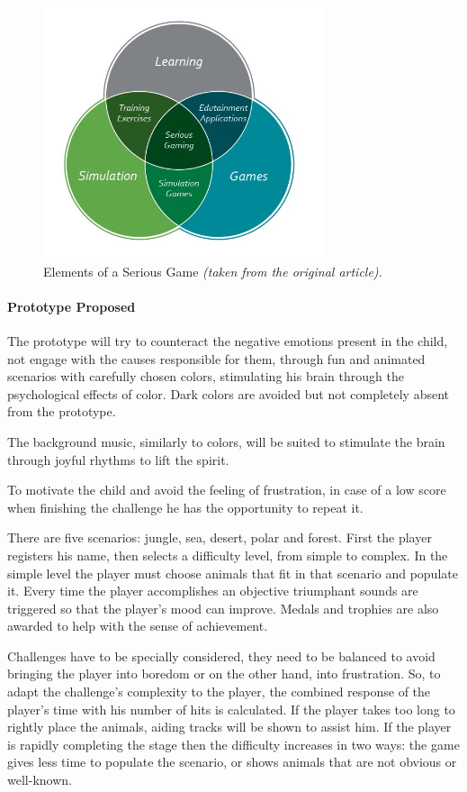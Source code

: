 \documentclass[runningheads]{llncs}
\begin{document}
\begin{figure}
    \centering
    \includegraphics[scale = 0.8]{Chatbot.png}
    \caption{Elements of a Serious Game \textit{(taken from the original article).}}
    \label{fig:Chatbot}
\end{figure}

\paragraph{Prototype Proposed} The prototype will try to counteract the negative emotions present in the child, not engage with the causes responsible for them, through fun and animated scenarios with carefully chosen colors, stimulating his brain through the psychological effects of color. Dark colors are avoided but not completely absent from the prototype.
\par The background music, similarly to colors, will be suited to stimulate the brain through joyful rhythms to lift the spirit.
\par To motivate the child and avoid the feeling of frustration, in case of a low score when finishing the challenge he has the opportunity to repeat it. 
\par There are five scenarios: jungle, sea, desert, polar and forest. First the player registers his name, then selects a difficulty level, from simple to complex. In the simple level the player must choose animals that fit in that scenario and populate it. Every time the player accomplishes an objective triumphant sounds are triggered so that the player's mood can improve. Medals and trophies are also awarded to help with the sense of achievement.
\par Challenges have to be specially considered, they need to be balanced to avoid bringing the player into boredom or on the other hand, into frustration. So, to adapt the challenge's complexity to the player, the combined response of the player's time with his number of hits is calculated. If the player takes too long to rightly place the animals, aiding tracks will be shown to assist him. If the player is rapidly completing the stage then the difficulty increases in two ways: the game gives less time to populate the scenario, or shows animals that are not obvious or well-known.
\end{document}
